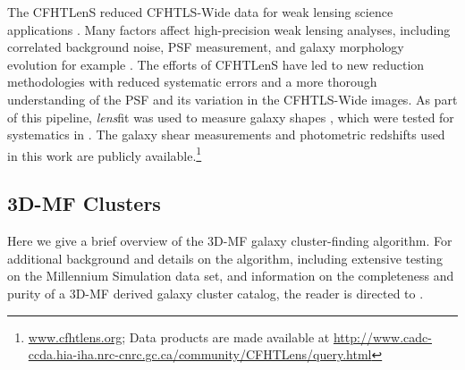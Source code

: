 The \ac{CFHTLenS} reduced \ac{CFHTLS}-Wide data for weak lensing science applications \citep{Heymans12,Erben13}. Many factors affect high-precision weak lensing analyses, including correlated background noise, PSF measurement, and galaxy morphology evolution for example \citep[for a more detailed list and study, see][]{step2,Heymans12}. The efforts of \ac{CFHTLenS} have led to new reduction methodologies with reduced systematic errors and a more thorough understanding of the PSF and its variation in the \ac{CFHTLS}-Wide images. As part of this pipeline, {\em lens}fit was used to measure galaxy shapes \citep{Miller13}, which were tested for systematics in \citet{Heymans12}. The galaxy shear measurements and photometric redshifts used in this work are publicly available.\footnote{\url{www.cfhtlens.org}; Data products are made available at \url{http://www.cadc-ccda.hia-iha.nrc-cnrc.gc.ca/community/CFHTLens/query.html}}


\subsection{\ac{3D-MF} Clusters}
\label{sec:3DMF4}

Here we give a brief overview of the \ac{3D-MF} galaxy cluster-finding algorithm. For additional background and details on the algorithm, including extensive testing on the Millennium Simulation data set, and information on the completeness and purity of a \ac{3D-MF} derived galaxy cluster catalog, the reader is directed to \citet{Milkeraitis10}.

